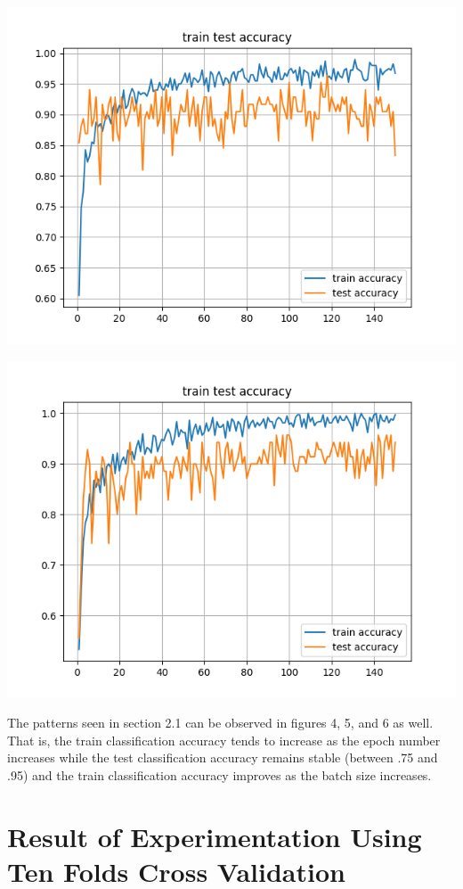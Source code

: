 \documentclass[12pt]{article}
\begin{document}
			\includegraphics[width=\linewidth - 2cm]{accuracy_2_hidden_layers.png}
			
			\includegraphics[width=\linewidth - 2cm]{accuracy_2_hl_30.png}
			
			The patterns seen in section 2.1 can be observed in figures 4, 5, and 6 as well. That is, the train classification accuracy tends to increase as the epoch number increases while the test classification accuracy remains stable (between .75 and .95) and the train classification accuracy improves as the 
			batch size increases.
	\section{Result of Experimentation Using Ten Folds Cross Validation}
	
\end{document}
